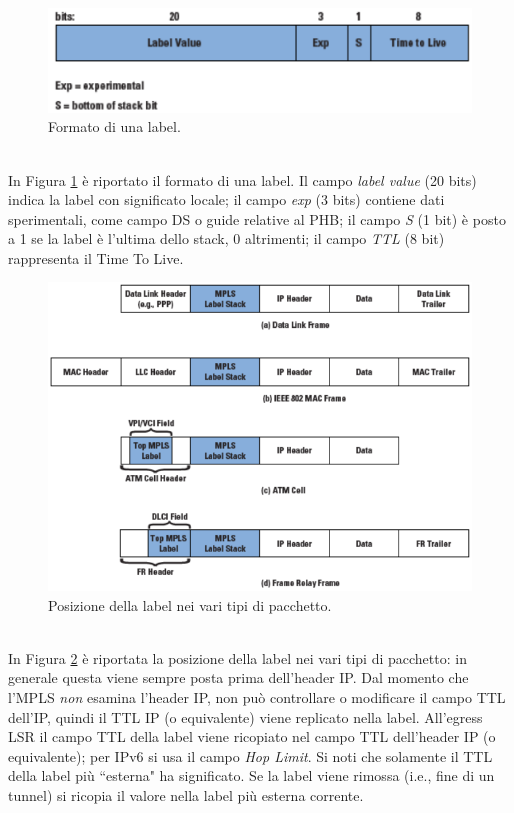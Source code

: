 \begin{figure}[htbp]
	\centering
	\includegraphics[scale = 0.55]{images/label-format}
	\caption{Formato di una label.}
	\label{img:label-format}
\end{figure}\\
In Figura \ref{img:label-format} è riportato il formato di una label. Il campo \textit{label value} (20 bits) indica la label con significato locale; il campo \textit{exp} (3 bits) contiene dati sperimentali, come campo DS o guide relative al PHB; il campo \textit{S} (1 bit) è posto a 1 se la label è l'ultima dello stack, 0 altrimenti; il campo \textit{TTL} (8 bit) rappresenta il Time To Live.
\begin{figure}[htbp]
	\centering
	\includegraphics[scale = 0.45]{images/label-position}
	\caption{Posizione della label nei vari tipi di pacchetto.}
	\label{img:label-position}
\end{figure}\\
In Figura \ref{img:label-position} è riportata la posizione della label nei vari tipi di pacchetto: in generale questa viene sempre posta prima dell'header IP. Dal momento che l'MPLS \textit{non} esamina l'header IP, non può controllare o modificare il campo TTL dell'IP, quindi il TTL IP (o equivalente) viene replicato nella label. All'egress LSR il campo TTL della label viene ricopiato nel campo TTL dell'header IP (o equivalente); per IPv6 si usa il campo \textit{Hop Limit}. Si noti che solamente il TTL della label più \textquotedblleft esterna" ha significato. Se la label viene rimossa (i.e., fine di un tunnel) si ricopia il valore nella label più esterna corrente.\\
